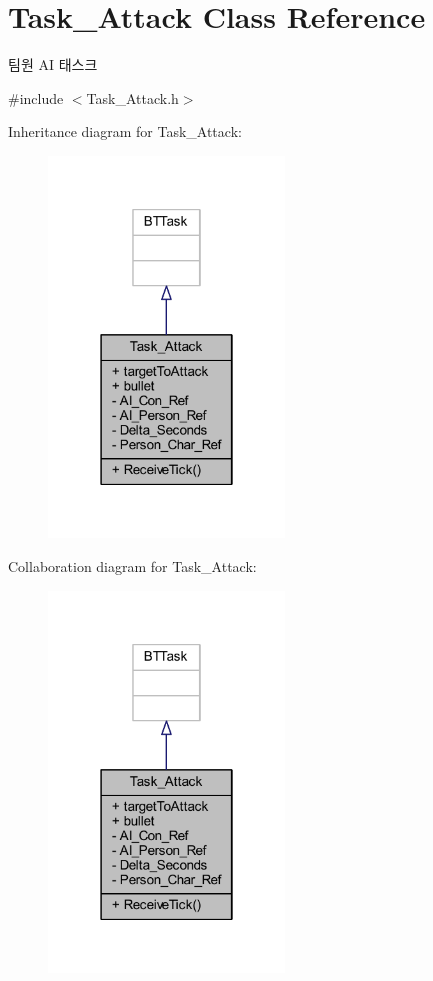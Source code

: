\hypertarget{class_task___attack}{}\section{Task\+\_\+\+Attack Class Reference}
\label{class_task___attack}


팀원 AI 태스크  




{\ttfamily \#include $<$Task\+\_\+\+Attack.\+h$>$}



Inheritance diagram for Task\+\_\+\+Attack\+:
\nopagebreak
\begin{figure}[H]
\begin{center}
\leavevmode
\includegraphics[width=178pt]{class_task___attack__inherit__graph}
\end{center}
\end{figure}


Collaboration diagram for Task\+\_\+\+Attack\+:
\nopagebreak
\begin{figure}[H]
\begin{center}
\leavevmode
\includegraphics[width=178pt]{class_task___attack__coll__graph}
\end{center}
\end{figure}
